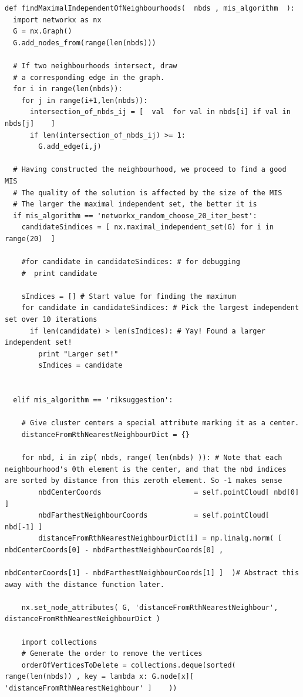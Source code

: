 \documentclass[11pt]{article}
\begin{document}
\begin{verbatim}
def findMaximalIndependentOfNeighbourhoods(  nbds , mis_algorithm  ):
  import networkx as nx
  G = nx.Graph()
  G.add_nodes_from(range(len(nbds)))

  # If two neighbourhoods intersect, draw 
  # a corresponding edge in the graph. 
  for i in range(len(nbds)):
    for j in range(i+1,len(nbds)):
      intersection_of_nbds_ij = [  val  for val in nbds[i] if val in nbds[j]    ] 
      if len(intersection_of_nbds_ij) >= 1:
        G.add_edge(i,j)

  # Having constructed the neighbourhood, we proceed to find a good MIS
  # The quality of the solution is affected by the size of the MIS
  # The larger the maximal independent set, the better it is
  if mis_algorithm == 'networkx_random_choose_20_iter_best': 
    candidateSindices = [ nx.maximal_independent_set(G) for i in range(20)  ]

    #for candidate in candidateSindices: # for debugging
    #  print candidate

    sIndices = [] # Start value for finding the maximum
    for candidate in candidateSindices: # Pick the largest independent set over 10 iterations
      if len(candidate) > len(sIndices): # Yay! Found a larger independent set!
        print "Larger set!"
        sIndices = candidate


  elif mis_algorithm == 'riksuggestion':

    # Give cluster centers a special attribute marking it as a center. 
    distanceFromRthNearestNeighbourDict = {}

    for nbd, i in zip( nbds, range( len(nbds) )): # Note that each neighbourhood's 0th element is the center, and that the nbd indices are sorted by distance from this zeroth element. So -1 makes sense
        nbdCenterCoords                      = self.pointCloud[ nbd[0] ] 
        nbdFarthestNeighbourCoords           = self.pointCloud[ nbd[-1] ]
        distanceFromRthNearestNeighbourDict[i] = np.linalg.norm( [ nbdCenterCoords[0] - nbdFarthestNeighbourCoords[0] ,
                                                                   nbdCenterCoords[1] - nbdFarthestNeighbourCoords[1] ]  )# Abstract this away with the distance function later. 

    nx.set_node_attributes( G, 'distanceFromRthNearestNeighbour', distanceFromRthNearestNeighbourDict )

    import collections
    # Generate the order to remove the vertices
    orderOfVerticesToDelete = collections.deque(sorted(  range(len(nbds)) , key = lambda x: G.node[x][ 'distanceFromRthNearestNeighbour' ]    ))


\end{verbatim}
\end{document}
